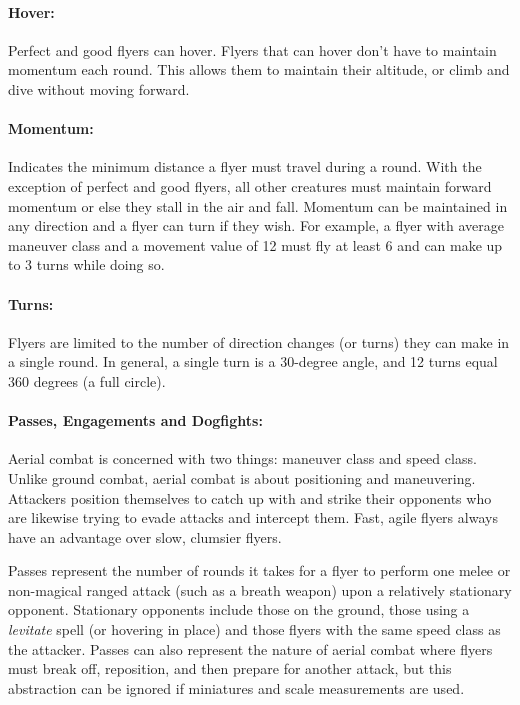 \begin{multicols}{2}
\begin{minipage}{\columnwidth}
\end{minipage}

\paragraph{Hover:} Perfect and good flyers can hover.  Flyers that can hover don't have to maintain momentum each round.  This allows them to maintain their altitude, or climb and dive without moving forward.

\paragraph{Momentum:} Indicates the minimum distance a flyer must travel during a round.  With the exception of perfect and good flyers, all other creatures must maintain forward momentum or else they stall in the air and fall.  Momentum can be maintained in any direction and a flyer can turn if they wish.  For example, a flyer with average maneuver class and a movement value of 12 must fly at least 6 and can make up to 3 turns while doing so.

\paragraph{Turns:} Flyers are limited to the number of direction changes (or turns) they can make in a single round.  In general, a single turn is a 30-degree angle, and 12 turns equal 360 degrees (a full circle).

\paragraph{Passes, Engagements and Dogfights:} Aerial combat is concerned with two things: maneuver class and speed class.  Unlike ground combat, aerial combat is about positioning and maneuvering.  Attackers position themselves to catch up with and strike their opponents who are likewise trying to evade attacks and intercept them.  Fast, agile flyers always have an advantage over slow, clumsier flyers.  

Passes represent the number of rounds it takes for a flyer to perform one melee or non-magical ranged attack (such as a breath weapon) upon a relatively stationary opponent.  Stationary opponents include those on the ground, those using a \textit{levitate} spell (or hovering in place) and those flyers with the same speed class as the attacker.  Passes can also represent the nature of aerial combat where flyers must break off, reposition, and then prepare for another attack, but this abstraction can be ignored if miniatures and scale measurements are used.


\end{multicols}
